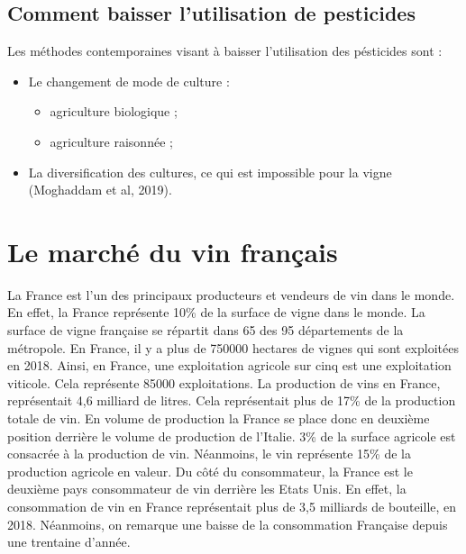 \documentclass[11pt,]{article}
\providecommand{\tightlist}{%
  \setlength{\itemsep}{0pt}\setlength{\parskip}{0pt}}
\begin{document}
\hypertarget{comment-baisser-lutilisation-de-pesticides}{%
\subsection{Comment baisser l'utilisation de
pesticides}\label{comment-baisser-lutilisation-de-pesticides}}

Les méthodes contemporaines visant à baisser l'utilisation des
pésticides sont :

\begin{itemize}
\tightlist
\item
  Le changement de mode de culture :

  \begin{itemize}
  \tightlist
  \item
    agriculture biologique ;
  \item
    agriculture raisonnée ;
  \end{itemize}
\item
  La diversification des cultures, ce qui est impossible pour la vigne
  (Moghaddam et al, 2019).
\end{itemize}

\hypertarget{le-marche-du-vin-francais}{%
\section{Le marché du vin français}\label{le-marche-du-vin-francais}}

La France est l'un des principaux producteurs et vendeurs de vin dans le
monde. En effet, la France représente 10\% de la surface de vigne dans
le monde. La surface de vigne française se répartit dans 65 des 95
départements de la métropole. En France, il y a plus de 750000 hectares
de vignes qui sont exploitées en 2018. Ainsi, en France, une
exploitation agricole sur cinq est une exploitation viticole. Cela
représente 85000 exploitations. La production de vins en France,
représentait 4,6 milliard de litres. Cela représentait plus de 17\% de
la production totale de vin. En volume de production la France se place
donc en deuxième position derrière le volume de production de l'Italie.
3\% de la surface agricole est consacrée à la production de vin.
Néanmoins, le vin représente 15\% de la production agricole en valeur.
Du côté du consommateur, la France est le deuxième pays consommateur de
vin derrière les Etats Unis. En effet, la consommation de vin en France
représentait plus de 3,5 milliards de bouteille, en 2018. Néanmoins, on
remarque une baisse de la consommation Française depuis une trentaine
d'année.
\end{document}
